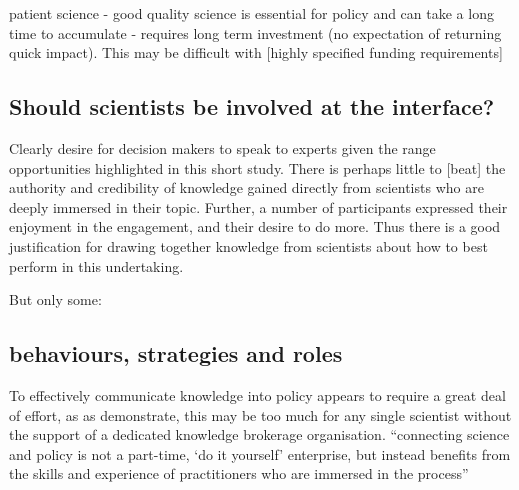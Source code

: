 patient science - good quality science is essential for policy and can take a long time to accumulate - requires long term investment (no expectation of returning quick impact). This may be difficult with [highly specified funding requirements]

\subsection{Should scientists be involved at the interface?}
Clearly desire for decision makers to speak to experts given the range opportunities highlighted in this short study. There is perhaps little to [beat] the  authority and credibility of knowledge gained directly from scientists who are deeply immersed in their topic. Further, a number of participants expressed their enjoyment in the engagement, and their desire to do more. Thus there is a good justification for drawing together knowledge from scientists about how to best perform in this undertaking.

But only some: 



\subsection{behaviours, strategies and roles}
To effectively communicate knowledge into policy appears to require a great deal of effort, as as \textcite{BednarekSHG2015} demonstrate, this may be too much for any single scientist without the support of a dedicated knowledge brokerage organisation. ``connecting science and policy is not a part-time, `do it yourself' enterprise, but instead benefits from the skills and experience of practitioners who are immersed in the process''

